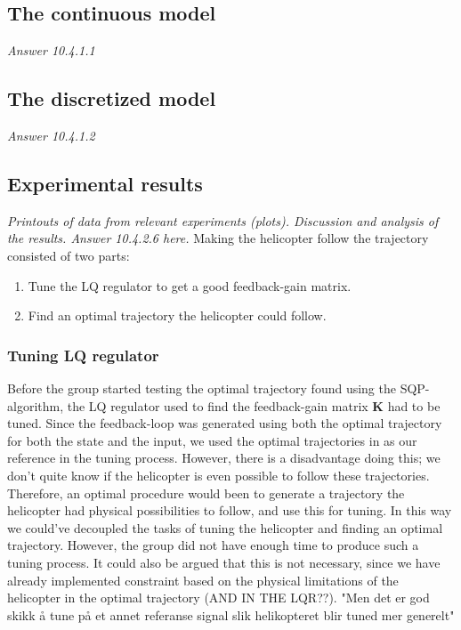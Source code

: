 \documentclass[../main.tex]{subfiles}
\begin{document}
\subsection{The continuous model}
\textit{Answer 10.4.1.1}

\subsection{The discretized model}
\textit{Answer 10.4.1.2}

\subsection{Experimental results}
\textit{Printouts of data from relevant experiments (plots).
Discussion and analysis of the results.
Answer 10.4.2.6 here.}
Making the helicopter follow the trajectory consisted of two parts: 
\begin{enumerate}
	\item Tune the LQ regulator to get a good feedback-gain matrix.
	\item Find an optimal trajectory the helicopter could follow.
\end{enumerate}

\subsubsection{Tuning LQ regulator}
Before the group started testing the optimal trajectory found using the SQP-algorithm, the LQ regulator used to find the feedback-gain matrix $\bm K$ had to be tuned. Since the feedback-loop was generated using both the optimal trajectory for both the state and the input, we used the optimal trajectories in as our reference in the tuning process. However, there is a disadvantage doing this; we don't quite know if the helicopter is even possible to follow these trajectories. Therefore, an optimal procedure would been to generate a trajectory the helicopter had physical possibilities to follow, and use this for tuning. In this way we could've decoupled the tasks of tuning the helicopter and finding an optimal trajectory. However, the group did not have enough time to produce such a tuning process. It could also be argued that this is not necessary, since we have already implemented constraint based on the physical limitations of the helicopter in the optimal trajectory (AND IN THE LQR??). "Men det er god skikk å tune på et annet referanse signal slik helikopteret blir tuned mer generelt"
\end{document}
